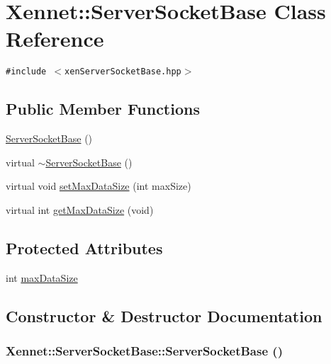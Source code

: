 \hypertarget{classXennet_1_1ServerSocketBase}{
\section{Xennet::ServerSocketBase Class Reference}
\label{classXennet_1_1ServerSocketBase}
}
{\tt \#include $<$xenServerSocketBase.hpp$>$}

\subsection*{Public Member Functions}
\begin{CompactItemize}
\item 
\hyperlink{classXennet_1_1ServerSocketBase_496da42d5fa8ebb779033bc4e436693b}{ServerSocketBase} ()
\item 
virtual \hyperlink{classXennet_1_1ServerSocketBase_c83e50e3708c65f0d578098798df0045}{$\sim$ServerSocketBase} ()
\item 
virtual void \hyperlink{classXennet_1_1ServerSocketBase_b7e2795ed9e29eca5a2192bb048fe2a7}{setMaxDataSize} (int maxSize)
\item 
virtual int \hyperlink{classXennet_1_1ServerSocketBase_6825c1738c87620724714dcc0962536c}{getMaxDataSize} (void)
\end{CompactItemize}
\subsection*{Protected Attributes}
\begin{CompactItemize}
\item 
int \hyperlink{classXennet_1_1ServerSocketBase_0d45d6d3353820921a31565c11410e69}{maxDataSize}
\end{CompactItemize}


\subsection{Constructor \& Destructor Documentation}
\hypertarget{classXennet_1_1ServerSocketBase_496da42d5fa8ebb779033bc4e436693b}{
\subsubsection{\setlength{\rightskip}{0pt plus 5cm}Xennet::ServerSocketBase::ServerSocketBase ()}}
\label{classXennet_1_1ServerSocketBase_496da42d5fa8ebb779033bc4e436693b}


